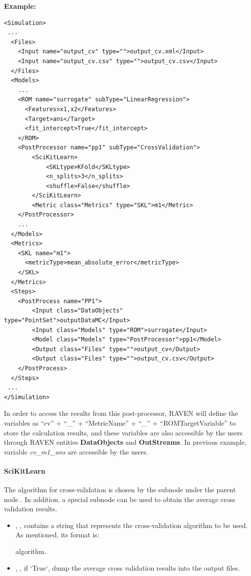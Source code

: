 \textbf{Example:}

\begin{lstlisting}[style=XML]
<Simulation>
 ...
  <Files>
    <Input name="output_cv" type="">output_cv.xml</Input>
    <Input name="output_cv.csv" type="">output_cv.csv</Input>
  </Files>
  <Models>
    ...
    <ROM name="surrogate" subType="LinearRegression">
      <Features>x1,x2</Features>
      <Target>ans</Target>
      <fit_intercept>True</fit_intercept>
    </ROM>
    <PostProcessor name="pp1" subType="CrossValidation">
        <SciKitLearn>
            <SKLtype>KFold</SKLtype>
            <n_splits>3</n_splits>
            <shuffle>False</shuffle>
        </SciKitLearn>
        <Metric class="Metrics" type="SKL">m1</Metric>
    </PostProcessor>
    ...
  </Models>
  <Metrics>
    <SKL name="m1">
      <metricType>mean_absolute_error</metricType>
    </SKL>
  </Metrics>
  <Steps>
    <PostProcess name="PP1">
        <Input class="DataObjects" type="PointSet">outputDataMC</Input>
        <Input class="Models" type="ROM">surrogate</Input>
        <Model class="Models" type="PostProcessor">pp1</Model>
        <Output class="Files" type="">output_cv</Output>
        <Output class="Files" type="">output_cv.csv</Output>
    </PostProcess>
  </Steps>
 ...
</Simulation>
\end{lstlisting}

In order to access the results from this post-processor, RAVEN will define the variables as ``cv'' +
``\_'' + ``MetricName'' + ``\_'' + ``ROMTargetVariable'' to store the calculation results, and these
variables are also accessible by the users through RAVEN entities \textbf{DataObjects} and \textbf{OutStreams}.
In previous example, variable \textit{cv\_m1\_ans} are accessible by the users.

\paragraph{SciKitLearn}

The algorithm for cross-validation is chosen by the subnode  under the parent node .
In addition, a special subnode  can be used to obtain the average cross validation results.

\begin{itemize}
  \item {}, , contains a string that
    represents the cross-validation algorithm to be used. As mentioned, its format is:

    algorithm.
  \item {}, , if `True`, dump the average cross validation results into the
    output files.
\end{itemize}


